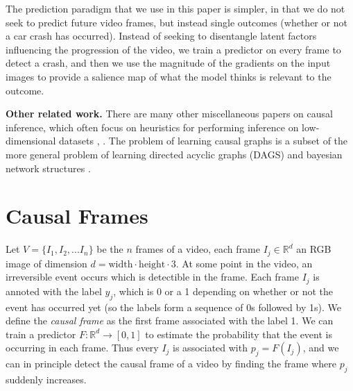 \documentclass[letterpaper, twocolumn]{article} %
\begin{document}
The prediction paradigm that we use in this paper is simpler, in that we do not seek to predict future video frames, but instead single outcomes (whether or not a car crash has occurred). Instead of seeking to disentangle latent factors influencing the progression of the video, we train a predictor on every frame to detect a crash, and then we use the magnitude of the gradients on the input images to provide a salience map of what the model thinks is relevant to the outcome. %

\noindent \textbf{Other related work.} There are many other miscellaneous papers on causal inference, which often focus on heuristics for performing inference on low-dimensional datasets \cite{veitch2019using}, \cite{rojas2018invariant}. The problem of learning causal graphs is a subset of the more general problem of learning directed acyclic graphs (DAGS) \cite{xie2008recursive} and bayesian network structures \cite{daly2011learning}. %




\section{Causal Frames}

Let $V = \{I_1, I_2, ... I_n\}$ be the $n$ frames of a video, each frame $I_j  \in \mathbb{R}^d$ an RGB image of dimension $d=\text{width}\cdot\text{height}\cdot 3$. At some point in the video, an irreversible event occurs which is detectible in the frame. Each frame $I_j$ is annoted with the label $y_j$, which is 0 or a 1 depending on whether or not the event has occurred yet (so the labels form a sequence of 0s followed by 1s). We define the \emph{causal frame} as the first frame associated with the label 1. We can train a predictor $F: \mathbb{R}^d \rightarrow [0,1]$ to estimate the probability that the event is occurring in each frame. Thus every $I_j$ is associated with $p_j = F(I_j)$, and we can in principle detect the causal frame of a video by finding the frame where $p_j$ suddenly increases.
\end{document}

